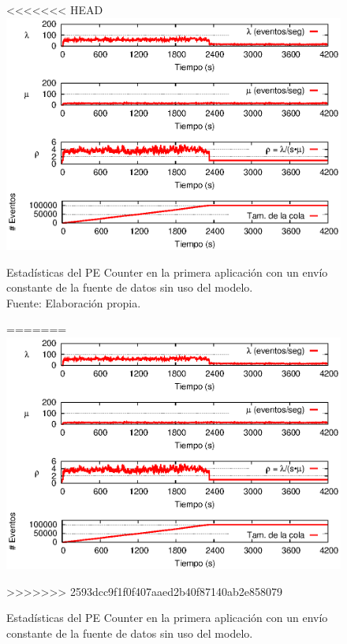 \begin{figure}[!ht]
<<<<<<< HEAD
    \centering
    \captionsetup{justification=centering}
    \includegraphics[scale=1]{images/exp/app1/uniform/sm/statusCounterPE.eps}
    \caption[Estadísticas del PE Counter en la primera aplicación con un envío constante de la fuente de datos sin uso del modelo.]{Estadísticas del PE Counter en la primera aplicación con un envío constante de la fuente de datos sin uso del modelo.\\Fuente: Elaboración propia.}
=======
\centering
    \includegraphics[scale=1.1]{images/exp/app1/uniform/sm/statusCounterPE.eps}
    \caption{Estad\'isticas del PE Counter en la primera aplicaci\'on con un env\'io constante de la fuente de datos sin uso del modelo.}
>>>>>>> 2593dcc9f1f0f407aaed2b40f87140ab2e858079
    \label{fig:app1-uniform-statusCounterPE-sm}
\end{figure}

